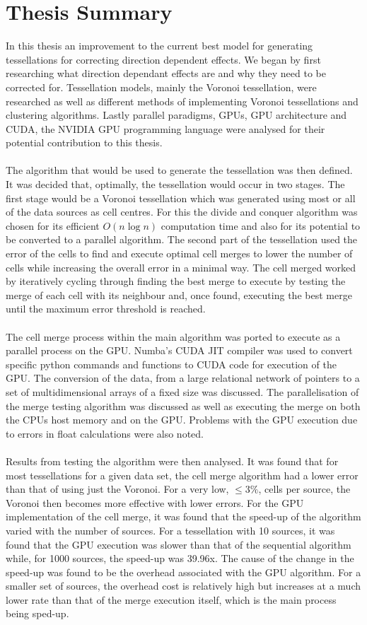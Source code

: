 \section{Thesis Summary}
In this thesis an improvement to the current best model for generating tessellations for correcting direction dependent effects. We began by first researching what direction dependant effects are and why they need to be corrected for. Tessellation models, mainly the Voronoi tessellation, were researched as well as different methods of implementing Voronoi tessellations and clustering algorithms. Lastly parallel paradigms, GPUs, GPU architecture and CUDA, the NVIDIA GPU programming language were analysed for their potential contribution to this thesis.
\\
\\
The algorithm that would be used to generate the tessellation was then defined. It was decided that, optimally, the tessellation would occur in two stages. The first stage would be a Voronoi tessellation which was generated using most or all of the data sources as cell centres. For this the divide and conquer algorithm was chosen for its efficient $O(n\log n)$ computation time and also for its potential to be converted to a parallel algorithm. The second part of the tessellation used the error of the cells to find and execute optimal cell merges to lower the number of cells while increasing the overall error in a minimal way. The cell merged worked by iteratively cycling through finding the best merge to execute by testing the merge of each cell with its neighbour and, once found, executing the best merge until the maximum error threshold is reached.
\\
\\
The cell merge process within the main algorithm was ported to execute as a parallel process on the GPU. Numba's CUDA JIT compiler was used to convert specific python commands and functions to CUDA code for execution of the GPU. The conversion of the data, from a large relational network of pointers to a set of multidimensional arrays of a fixed size was discussed. The parallelisation of the merge testing algorithm was discussed as well as executing the merge on both the CPUs host memory and on the GPU. Problems with the GPU execution due to errors in float calculations were also noted.
\\
\\
Results from testing the algorithm were then analysed. It was found that for most tessellations for a given data set, the cell merge algorithm had a lower error than that of using just the Voronoi. For a very low, $\leq 3\%$, cells per source, the Voronoi then becomes more effective with lower errors. For the GPU implementation of the cell merge, it was found that the speed-up of the algorithm varied with the number of sources. For a tessellation with 10 sources, it was found that the GPU execution was slower than that of the sequential algorithm while, for 1000 sources, the speed-up was 39.96x. The cause of the change in the speed-up was found to be the overhead associated with the GPU algorithm. For a smaller set of sources, the overhead cost is relatively high but increases at a much lower rate than that of the merge execution itself, which is the main process being sped-up.